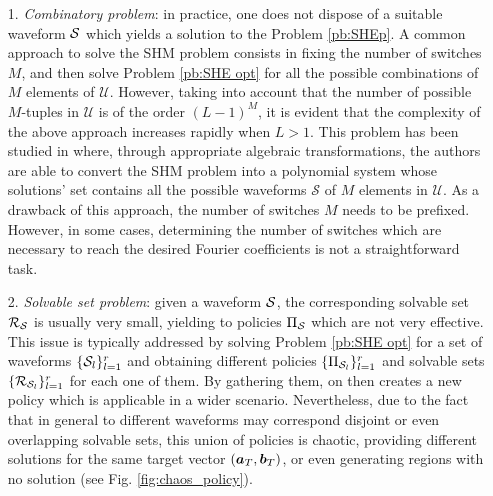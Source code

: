 \documentclass[twocolumn]{autart}    %
\begin{document}
\begin{itemize}
	\item[1.] \textit{Combinatory problem}: in practice, one does not dispose of a suitable waveform $\mathcal{S}$ which yields a solution to the Problem \ref{pb:SHEp}. A common approach to solve the SHM problem consists in fixing the number of switches $M$, and then solve Problem \ref{pb:SHE opt} for  all the possible combinations of $M$ elements of $\mathcal{U}$. However, taking into account that the number of possible $M$-tuples  in $\mathcal U$ is of the order $(L-1)^M$, it is evident that the complexity of the above approach increases rapidly when $L>1$. This problem has been studied in \cite{Yang2015} where, through appropriate algebraic transformations, the authors are able to convert the SHM problem into a polynomial system whose solutions' set contains all the possible waveforms $\mathcal S$ of $M$ elements in $\mathcal{U}$. As a drawback of this approach, the number of switches $M$ needs to be prefixed. However, in some cases,  determining the number of switches which are necessary to reach the desired Fourier coefficients is not a straightforward task.
	
	\item[2.] \textit{Solvable set problem}: given a waveform $\mathcal{S}$, the corresponding solvable set $\mathcal{R}_{\mathcal{S}}$ is usually very small, yielding to policies $\Pi_{\mathcal{S}}$ which are not very effective. This issue is typically addressed by solving Problem \ref{pb:SHE opt} for a set of waveforms $\{\mathcal{S}_l\}_{l=1}^r$ and obtaining different policies $\{\Pi_{\mathcal{S}_l}\}_{l=1}^r$ and solvable sets $\{\mathcal{R}_{\mathcal{S}_l}\}_{l=1}^r$ for each one of them. By gathering them, on then creates a new policy which is applicable in a wider scenario. Nevertheless, due to the fact that in general to different waveforms may correspond disjoint or even overlapping solvable sets, this union of policies is chaotic, providing different solutions for the same target vector $(\bm{a}_T,\bm{b}_T)$, or even generating regions with no solution (see Fig. \ref{fig:chaos_policy}).
	

\end{itemize}
\end{document}
